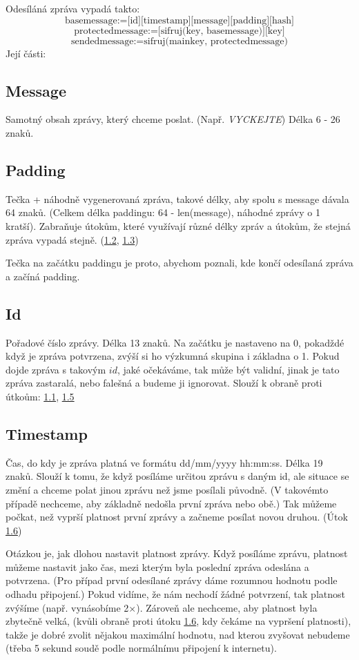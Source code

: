 \documentclass{article}
\begin{document}
Odesíláná zpráva vypadá takto:
\[\text{basemessage} := \text{[id][timestamp][message][padding][hash]}\]
\[\text{protectedmessage} := \text{[sifruj(key, basemessage)][key]}\]
\[\text{sendedmessage} := \text{sifruj(mainkey, protectedmessage)}\]
Její části:
\subsection{Message}
Samotný obsah zprávy, který chceme poslat. (Např. \emph{VYCKEJTE}) Délka 6 - 26 znaků.

\subsection{Padding}
Tečka + náhodně vygenerovaná zpráva, takové délky, aby spolu s message dávala 64 znaků. (Celkem délka paddingu: 64 - len(message), náhodné zprávy o 1 kratší). Zabraňuje útokům,
které využívají různé délky zpráv a útokům, že stejná zpráva vypadá stejně. (\hyperref[1.2]{1.2}, \hyperref[1.3]{1.3})

Tečka na začátku paddingu je proto, abychom poznali, kde končí odesílaná zpráva a začíná padding.

\subsection{Id}
Pořadové číslo zprávy. Délka 13 znaků. Na začátku je nastaveno na 0, pokadždé když je zpráva potvrzena, zvýší si ho výzkumná skupina i základna o 1.
Pokud dojde zpráva s takovým \(id\), jaké očekáváme, tak může být validní, jinak je tato zpráva zastaralá, nebo falešná a budeme ji ignorovat.
Slouží k obraně proti útkoům: \hyperref[1.1]{1.1}, \hyperref[1.5]{1.5}

\subsection{Timestamp}
Čas, do kdy je zpráva platná ve formátu dd/mm/yyyy hh:mm:ss. Délka 19 znaků. Slouží k tomu, že když posíláme určitou zprávu s daným id, ale situace se změní a chceme
polat jinou zprávu než jsme posílali původně. (V takovémto případě nechceme, aby základně nedošla první zpráva nebo obě.) Tak můžeme počkat, než vyprší platnost
první zprávy a začneme posílat novou druhou. (Útok \hyperref[1.6]{1.6})

Otázkou je, jak dlohou nastavit platnost zprávy. Když posíláme zprávu, platnost můžeme nastavit jako čas, mezi kterým byla poslední zpráva odeslána a potvrzena.
(Pro případ první odesílané zprávy dáme rozumnou hodnotu podle odhadu připojení.) Pokud vidíme, že nám nechodí žádné potvrzení, tak platnost zvýšíme (např. vynásobíme 2×).
Zároveň ale nechceme, aby platnost byla zbytečně velká, (kvůli obraně proti útoku \hyperref[1.6]{1.6}, kdy čekáme na vypršení platnosti), takže je dobré zvolit nějakou maximální
hodnotu, nad kterou zvyšovat nebudeme (třeba 5 sekund soudě podle normálnímu připojení k internetu).
\end{document}
